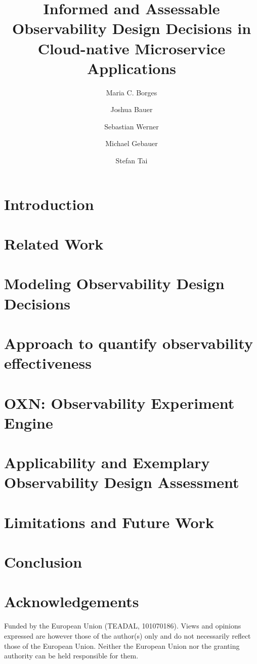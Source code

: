 \documentclass[twocolumn,final]{article}
\title{Informed and Assessable Observability Design Decisions in Cloud-native Microservice Applications}
\author[1]{Maria C. Borges}
\author[1]{Joshua Bauer}
\author[1]{Sebastian Werner}
\author[1]{Michael Gebauer}
\author[1]{Stefan Tai}
\affil[1]{Information Systems Engineering,
Technische Universität Berlin, Germany}
\begin{document}


\section{Introduction}\label{sec:intro}
\section{Related Work}\label{sec:background}
\section{Modeling Observability Design Decisions}\label{sec:model1}
\section{Approach to quantify observability effectiveness}\label{sec:concept}
\section{OXN: Observability Experiment Engine}\label{sec:architecture}
\section{Applicability and Exemplary Observability Design Assessment}\label{sec:eval}
\section{Limitations and Future Work}\label{sec:discussion}

\section{Conclusion}\label{sec:conclusion}
\vspace{1em}
\section*{Acknowledgements}

\small \noindent Funded by the European Union (TEADAL, 101070186). Views and opinions expressed are however those of the author(s) only and do not necessarily reflect those of the European Union. Neither the European Union nor the granting authority can be held responsible for them.

\end{document}
